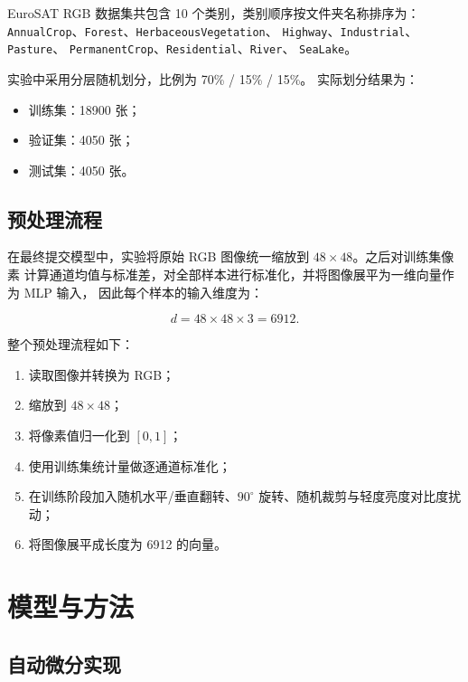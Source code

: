 \documentclass[12pt,a4paper,fontset=none]{ctexart}
\begin{document}
EuroSAT RGB 数据集共包含 10 个类别，类别顺序按文件夹名称排序为：
\texttt{AnnualCrop}、\texttt{Forest}、\texttt{HerbaceousVegetation}、
\texttt{Highway}、\texttt{Industrial}、\texttt{Pasture}、
\texttt{PermanentCrop}、\texttt{Residential}、\texttt{River}、
\texttt{SeaLake}。

实验中采用分层随机划分，比例为 70\% / 15\% / 15\%。
实际划分结果为：

\begin{itemize}
    \item 训练集：18900 张；
    \item 验证集：4050 张；
    \item 测试集：4050 张。
\end{itemize}

\subsection{预处理流程}

在最终提交模型中，实验将原始 RGB 图像统一缩放到 $48 \times 48$。之后对训练集像素
计算通道均值与标准差，对全部样本进行标准化，并将图像展平为一维向量作为 MLP 输入，
因此每个样本的输入维度为：

\begin{equation}
    d = 48 \times 48 \times 3 = 6912.
\end{equation}

整个预处理流程如下：

\begin{enumerate}
    \item 读取图像并转换为 RGB；
    \item 缩放到 $48 \times 48$；
    \item 将像素值归一化到 $[0,1]$；
    \item 使用训练集统计量做逐通道标准化；
    \item 在训练阶段加入随机水平/垂直翻转、$90^\circ$ 旋转、随机裁剪与轻度亮度对比度扰动；
    \item 将图像展平成长度为 6912 的向量。
\end{enumerate}

\section{模型与方法}

\subsection{自动微分实现}
\end{document}
